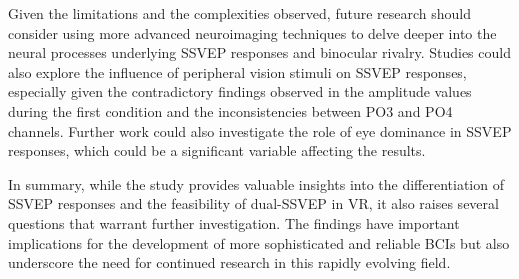 Given the limitations and the complexities observed, future research should consider using more advanced neuroimaging techniques to delve deeper into the neural processes underlying SSVEP responses and binocular rivalry. Studies could also explore the influence of peripheral vision stimuli on SSVEP responses, especially given the contradictory findings observed in the amplitude values during the first condition and the inconsistencies between PO3 and PO4 channels. Further work could also investigate the role of eye dominance in SSVEP responses, which could be a significant variable affecting the results.

In summary, while the study provides valuable insights into the differentiation of SSVEP responses and the feasibility of dual-SSVEP in VR, it also raises several questions that warrant further investigation. The findings have important implications for the development of more sophisticated and reliable BCIs but also underscore the need for continued research in this rapidly evolving field.
